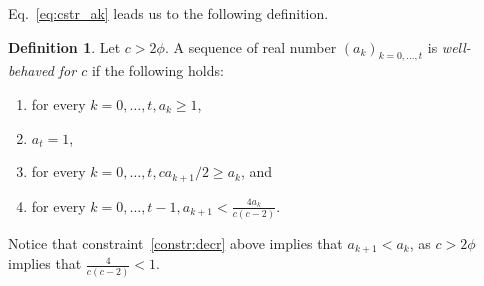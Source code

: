 \documentclass[a4paper, 11pt]{article}
\theoremstyle{plain}
\theoremstyle{definition}
\newtheorem{definition}[theorem]{Definition}
\theoremstyle{remark}
\begin{document}
Eq.~\ref{eq:cstr_ak} leads us to the following definition.
\begin{definition}
	Let $c > 2\phi$.
	A sequence of real number $(a_k)_{k=0,\ldots,t}$ is \textit{well-behaved for $c$}
	if the following holds:
	\begin{enumerate}
		\item for every $k=0,\ldots,t, a_k \ge 1$,
		\item $a_t = 1$,
		\item for every $k=0,\ldots,t, c a_{k+1}/2  \ge a_k$, and
		\item\label{constr:decr} for every $k=0,\ldots,t-1, a_{k+1} < \frac{4a_k}{c(c-2)}$.
	\end{enumerate}
\end{definition}
Notice that constraint~\ref{constr:decr} above implies that $a_{k+1} < a_k$,
as $c > 2\phi$ implies that $\frac{4}{c(c-2)} < 1$.
\end{document}
